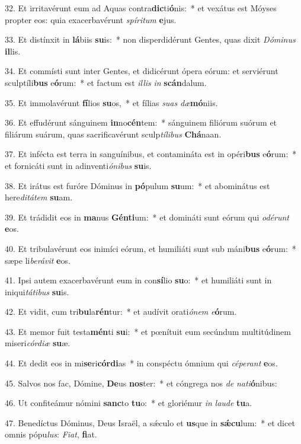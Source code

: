 32. Et irritavérunt eum ad Aquas contra\textbf{dic}ti\textbf{ó}nis:~*  et vexátus est Móyses propter eos: quia exacerbavérunt \textit{spí}\textit{ri}\textit{tum} \textbf{e}jus.\

33. Et distínxit in \textbf{lá}biis \textbf{su}is:~*  non disperdidérunt Gentes, quas dixit \textit{Dó}\textit{mi}\textit{nus} \textbf{il}lis.\

34. Et commísti sunt inter Gentes, et didicérunt ópera eórum: et serviérunt sculptíli\textbf{bus} e\textbf{ó}rum:~*  et factum est \textit{il}\textit{lis} \textit{in} \textbf{scán}dalum.\

35. Et immolavérunt \textbf{fí}lios \textbf{su}os,~*  et fílias \textit{su}\textit{as} \textit{dæ}\textbf{mó}niis.\

36. Et effudérunt sánguinem \textbf{in}no\textbf{cén}tem:~*  sánguinem filiórum suórum et filiárum suárum, quas sacrificavérunt sculp\textit{tí}\textit{li}\textit{bus} \textbf{Chá}naan.\

37. Et infécta est terra in sanguínibus, et contamináta est in opéri\textbf{bus} e\textbf{ó}rum:~*  et fornicáti sunt in adinventi\textit{ó}\textit{ni}\textit{bus} \textbf{su}is.\

38. Et irátus est furóre Dóminus in \textbf{pó}pulum \textbf{su}um:~*  et abominátus est here\textit{di}\textit{tá}\textit{tem} \textbf{su}am.\

39. Et trádidit eos in \textbf{ma}nus \textbf{Gén}\textbf{ti}um:~*  et domináti sunt eórum qui \textit{o}\textit{dé}\textit{runt} \textbf{e}os.\

40. Et tribulavérunt eos inimíci eórum, et humiliáti sunt sub máni\textbf{bus} e\textbf{ó}rum:~*  sæpe li\textit{be}\textit{rá}\textit{vit} \textbf{e}os.\

41. Ipsi autem exacerbavérunt eum in con\textbf{sí}lio \textbf{su}o:~*  et humiliáti sunt in iniqui\textit{tá}\textit{ti}\textit{bus} \textbf{su}is.\

42. Et vidit, cum tri\textbf{bu}la\textbf{rén}tur:~*  et audívit orati\textit{ó}\textit{nem} \textit{e}\textbf{ó}rum.\

43. Et memor fuit testa\textbf{mén}ti \textbf{su}i:~*  et pœnítuit eum secúndum multitúdinem miseri\textit{cór}\textit{di}\textit{æ} \textbf{su}æ.\

44. Et dedit eos in mi\textbf{se}ri\textbf{cór}\textbf{di}as~*  in conspéctu ómnium qui \textit{cé}\textit{pe}\textit{rant} \textbf{e}os.\

45. Salvos nos fac, Dómine, \textbf{De}us \textbf{nos}ter:~*  et cóngrega nos \textit{de} \textit{na}\textit{ti}\textbf{ó}nibus:\

46. Ut confiteámur nómini \textbf{sanc}to \textbf{tu}o:~*  et gloriémur \textit{in} \textit{lau}\textit{de} \textbf{tu}a.\

47. Benedíctus Dóminus, Deus Israël, a sǽculo et \textbf{us}que in \textbf{sǽ}\textbf{cu}lum:~*  et dicet omnis pópu\textit{lus}: \textit{Fi}\textit{at}, \textbf{fi}at.\

